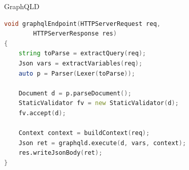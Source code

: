 \documentclass[aspectratio=169,notes]{beamer}
\begin{document}
	\begin{frame}[fragile]{GraphQLD}
\begin{lstlisting}[language=D,basicstyle=\small\ttfamily]
void graphqlEndpoint(HTTPServerRequest req, 
		HTTPServerResponse res) 
{
	string toParse = extractQuery(req);
	Json vars = extractVariables(req);
	auto p = Parser(Lexer(toParse));

	Document d = p.parseDocument();
	StaticValidator fv = new StaticValidator(d);
	fv.accept(d);

	Context context = buildContext(req);
	Json ret = graphqld.execute(d, vars, context);
	res.writeJsonBody(ret);
}
\end{lstlisting}
	\end{frame}
\end{document}
